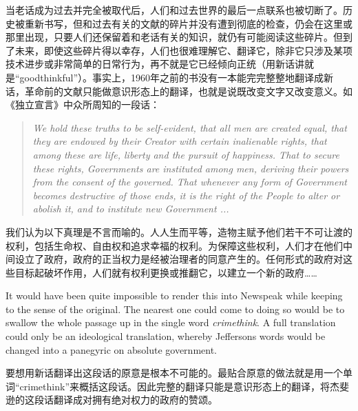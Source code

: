 \begin{paracol}{2}
当老话成为过去并完全被取代后，人们和过去世界的最后一点联系也被切断了。历史被重新书写，但和过去有关的文献的碎片并没有遭到彻底的检查，仍会在这里或那里出现，只要人们还保留着和老话有关的知识，就仍有可能阅读这些碎片。但到了未来，即使这些碎片得以幸存，人们也很难理解它、翻译它，除非它只涉及某项技术进步或非常简单的日常行为，再不就是它已经倾向正统（用新话讲就是``goodthinkful''）。事实上，1960年之前的书没有一本能完完整整地翻译成新话，革命前的文献只能做意识形态上的翻译，也就是说既改变文字又改变意义。如《独立宣言》中众所周知的一段话：

\switchcolumn*

\begin{quotation}
\emph{We hold these truths to be self-evident, that all men are created
equal, that they are endowed by their Creator with certain inalienable
rights, that among these are life, liberty and the pursuit of happiness.
That to secure these rights, Governments are instituted among men,
deriving their powers from the consent of the governed. That whenever
any form of Government becomes destructive of those ends, it is the
right of the People to alter or abolish it, and to institute new
Government ...}
\end{quotation}

\switchcolumn

我们认为以下真理是不言而喻的。人人生而平等，造物主赋予他们若干不可让渡的权利，包括生命权、自由权和追求幸福的权利。为保障这些权利，人们才在他们中间设立了政府，政府的正当权力是经被治理者的同意产生的。任何形式的政府对这些目标起破坏作用，人们就有权利更换或推翻它，以建立一个新的政府\ldots\ldots{}

\switchcolumn*

It would have been quite impossible to render this into Newspeak while
keeping to the sense of the original. The nearest one could come to
doing so would be to swallow the whole passage up in the single word
\emph{crimethink}. A full translation could only be an ideological
translation, whereby Jefferson\textquotesingle s words would be changed
into a panegyric on absolute government.

\switchcolumn

要想用新话翻译出这段话的原意是根本不可能的。最贴合原意的做法就是用一个单词``crimethink''来概括这段话。因此完整的翻译只能是意识形态上的翻译，将杰斐逊的这段话翻译成对拥有绝对权力的政府的赞颂。

\switchcolumn*


\end{paracol}
